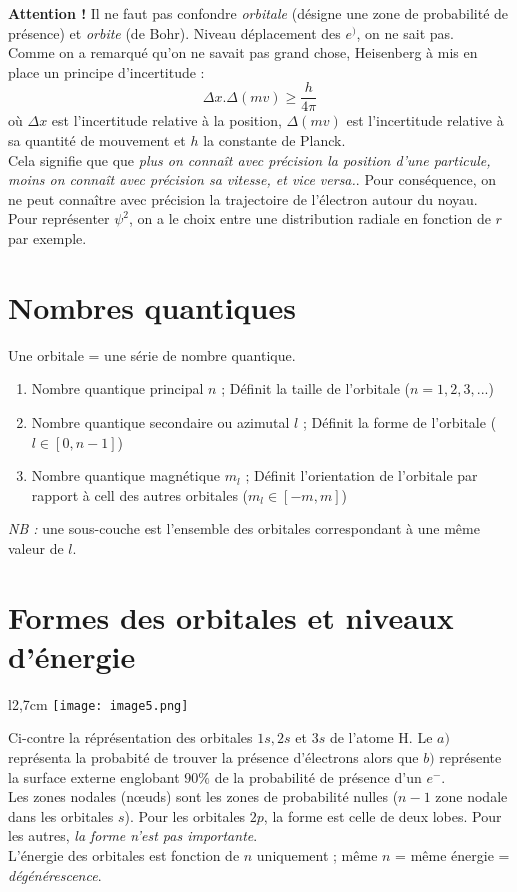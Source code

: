 \documentclass[british,french,11pt, a4paper, openany]{book}
\begin{document}
\textbf{Attention ! } Il ne faut pas confondre \textit{orbitale} (désigne une zone de probabilité de présence) et \textit{orbite} (de Bohr). Niveau déplacement des $e^)$, on ne sait pas.\\

Comme on a remarqué qu'on ne savait pas grand chose, Heisenberg à mis en place un principe d'incertitude :
$$\Delta x . \Delta (mv) \geq \frac{h}{4\pi}$$
où $\Delta x$ est l'incertitude relative à la position, $\Delta (mv)$ est l'incertitude relative à sa quantité de mouvement et $h$ la constante de Planck.\\
Cela signifie que que \textit{plus on connaît avec précision la position d'une particule, moins on connaît avec précision sa vitesse, et vice versa.}. Pour conséquence, on ne peut connaître avec précision la trajectoire de l'électron autour du noyau.\\

Pour représenter $\psi^2$, on a le choix entre une distribution radiale en fonction de $r$ par exemple.

\section{Nombres quantiques}
Une orbitale = une série de nombre quantique.
\begin{enumerate}
	\item Nombre quantique principal $n$ ; Définit la taille de l'orbitale ($n = 1, 2, 3, ...$)
	\item Nombre quantique secondaire ou azimutal $l$ ; Définit la forme de l'orbitale ($l \in [0, n-1]$)
	\item Nombre quantique magnétique $m_l$ ; Définit l'orientation de l'orbitale par rapport à cell des autres orbitales ($m_l \in [-m, m]$)
\end{enumerate}
\textit{NB  :} une sous-couche est l'ensemble des orbitales correspondant à une même valeur de $l$.

\section{Formes des orbitales et niveaux d'énergie}
\begin{wrapfigure}[8]{l}{2,7cm}
	\texttt{[image: image5.png]}
\end{wrapfigure}
Ci-contre la réprésentation des orbitales $1s, 2s$ et $3s$ de l'atome H. Le $a)$ représenta la probabité de trouver la présence d'électrons alors que $b)$ représente la surface externe englobant $90\%$ de la probabilité de présence d'un $e^-$.\\
Les zones nodales (nœuds) sont les zones de probabilité nulles ($n-1$ zone nodale dans les orbitales $s$).
Pour les orbitales $2p$, la forme est celle de deux lobes. Pour les autres, \textit{la forme n'est pas importante}.\\
L'énergie des orbitales est fonction de $n$ uniquement ; même $n$ = même énergie = \textit{dégénérescence}.
\end{document}
